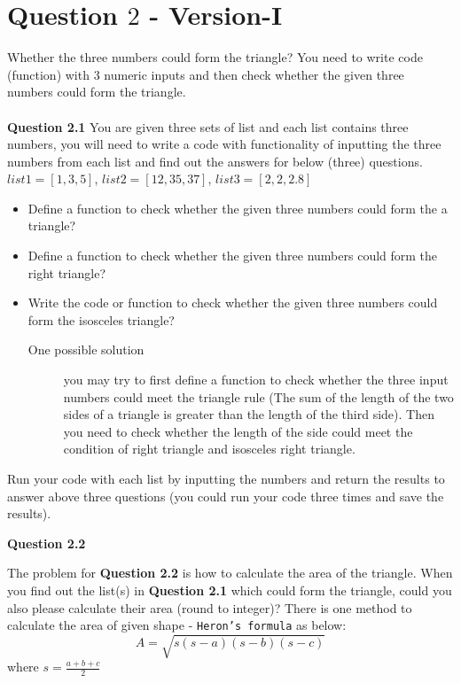 \documentclass[a4paper]{article}
\begin{document}
    \section{Question $2$ - Version-I}

    \begin{answer}

    Whether the three numbers could form the triangle? You need to write  code (function) with 3 numeric inputs and then check whether the given three numbers could form the triangle. \\
    \\
    \textbf{Question 2.1}
    You are given three sets of list and each list contains three numbers, you will need to write a code with functionality of inputting the three numbers from each list and find out the answers for below (three) questions.
    $list1 = [1,3,5]$, $list2 = [12,35,37]$, $list3 = [2,2,2.8]$
    \begin{itemize}
        \item Define a function to check whether the given three numbers could form the
        a triangle?
        \item Define a function to check whether the given three numbers could form the right triangle?

        \item Write the code or function to check whether the given three numbers could form the isosceles triangle?

        \begin{description}
            \item[One possible solution]
            you may try to first define a function to check whether the three input numbers could meet the triangle rule (The sum of the length of the two sides of a triangle is greater than the length of the third side).
            Then you need to check whether the length of the side could meet the condition of right triangle and isosceles right triangle.
        \end{description}
    \end{itemize}

    Run your code with each list by inputting the numbers and return the results to answer above three questions (you could run your code three times and save the results).


    \textbf{Question 2.2}

    The problem for \textbf{Question 2.2} is how to calculate the area of the triangle. When you find out the list(s) in \textbf{Question 2.1} which could form the triangle, could you also please calculate their area (round to integer)?
    There is one method to calculate the area of given shape
    - \texttt{Heron's formula} as below:
   \begin{equation} \label{eq:area}
        A = \sqrt{s(s-a)(s-b)(s-c)}
    \end{equation}
    where $s =  \frac{a+b+c}{2}$\\


\end{answer}
\end{document}
